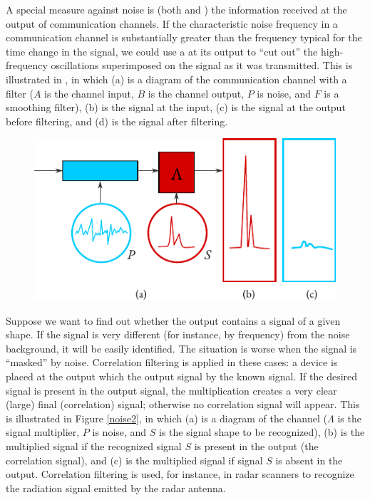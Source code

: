 A special measure against noise is  (both  and
) the information received at the output of communication
channels. If the characteristic noise frequency in a communication
channel is substantially greater than the frequency typical for the time
change in the signal, we could use a  at its output to ``cut out'' the high-frequency oscillations superimposed on the signal as it was
transmitted. This is illustrated in , in which (a) is a diagram of the communication channel with a filter ($A$ is the channel input, $B$ is the
channel output, $P$ is noise, and $F$ is a smoothing filter), (b) is the signal at the input, (c) is the signal at the output before filtering, and (d) is the signal after filtering.
\begin{figure}[!ht]
 \centering
 \includegraphics[width=0.8\linewidth]{figures/noise2.pdf}
 \end{figure}
 
Suppose we want to find out whether the output contains a signal of
a given shape. If the signal is very different (for instance, by frequency)
from the noise background, it will be easily identified. The situation is
worse when the signal is ``masked'' by noise. Correlation filtering is
applied in these cases: a device is placed at the output which 
the output signal by the known signal. If the desired signal is present in
the output signal, the multiplication creates a very clear (large) final
(correlation) signal; otherwise no correlation signal will appear. This is
illustrated in Figure \ref{noise2}, in which (a) is a diagram of the channel ($\Lambda$ is the signal multiplier, $P$ is noise, and $S$ is the signal shape to be recognized), (b) is the multiplied signal if the recognized signal $S$ is present in the output (the correlation signal), and (c) is the multiplied signal if signal $S$ is absent in the output. Correlation filtering is used, for instance, in radar scanners to recognize the radiation signal emitted by the radar antenna.

